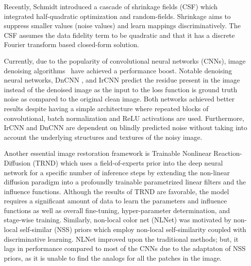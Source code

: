 \documentclass[10pt,twocolumn,letterpaper]{article}
\begin{document}
Recently, Schmidt \etal \cite{schmidt2014CSF} introduced a cascade of shrinkage fields (CSF) which integrated half-quadratic optimization and random-fields. Shrinkage aims to suppress smaller values (noise values) and learn mappings discriminatively. The CSF assumes the data fidelity term to be quadratic and that it has a discrete Fourier transform based closed-form solution.

Currently, due to the popularity of convolutional neural networks (CNNs), image denoising algorithms~\cite{zhang2017DnCNN,zhang2017IRCNN,lefkimmiatis2017NLNet, Burger2012MLP,schmidt2014CSF,anwar2017chaining} have achieved a performance boost. Notable denoising neural networks, DnCNN \cite{zhang2017DnCNN}, and IrCNN \cite{zhang2017IRCNN} predict the residue present in the image instead of the denoised image as the input to the loss function is ground truth noise as compared to the original clean image. Both networks achieved better results despite having a simple architecture where repeated blocks of convolutional, batch normalization and ReLU activations are used. Furthermore,  IrCNN \cite{zhang2017IRCNN} and DnCNN \cite{zhang2017DnCNN} are dependent on blindly predicted noise \ie without taking into account the underlying structures and textures of the noisy image.



Another essential image restoration framework is Trainable Nonlinear Reaction-Diffusion (TRND) \cite{chen2017TNRD} which uses a field-of-experts prior \cite{roth2009fields} into the deep neural network for a specific number of inference steps by extending the non-linear diffusion paradigm into a profoundly trainable parametrized linear filters and the influence functions.  Although the results of TRND are favorable, the model requires a significant amount of data to learn the parameters and influence functions as well as overall fine-tuning, hyper-parameter determination, and stage-wise training.  Similarly, non-local color net (NLNet) \cite{lefkimmiatis2017NLNet} was motivated by non-local self-similar (NSS) priors which employ non-local self-similarity coupled with discriminative learning. NLNet improved upon the traditional methods; but, it lags in performance compared to most of the CNNs \cite{zhang2017IRCNN,zhang2017DnCNN} due to the adaptaton of NSS priors, as it is unable to find the analogs for all the patches in the image.
\end{document}
